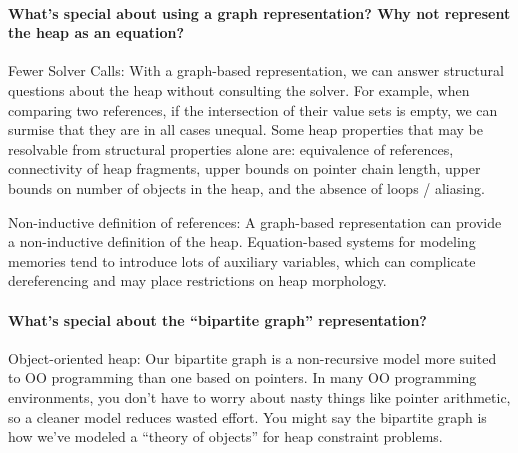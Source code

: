 \paragraph{What’s special about using a graph representation? Why not represent the heap as an equation?}
\begin{compactdesc}
\item[Fewer Solver Calls:] 
With a graph-based representation, we can answer structural questions
about the heap without consulting the solver. For example, when
comparing two references, if the intersection of their value sets is
empty, we can surmise that they are in all cases unequal. Some heap
properties that may be resolvable from structural properties alone
are: equivalence of references, connectivity of heap fragments, upper
bounds on pointer chain length, upper bounds on number of objects in
the heap, and the absence of loops / aliasing.

\item[Non-inductive definition of references:] 
A graph-based representation can provide a non-inductive definition of
the heap. Equation-based systems for modeling memories tend to
introduce lots of auxiliary variables, which can complicate
dereferencing and may place restrictions on heap morphology.  
\end{compactdesc}

\paragraph{What’s special about the “bipartite graph” representation?}
\begin{compactdesc}
\item[Object-oriented heap:] 
Our bipartite graph is a non-recursive model more suited to OO
programming than one based on pointers. In many OO programming
environments, you don’t have to worry about nasty things like pointer
arithmetic, so a cleaner model reduces wasted effort. You might say
the bipartite graph is how we’ve modeled a “theory of objects” for
heap constraint problems.
\end{compactdesc}
